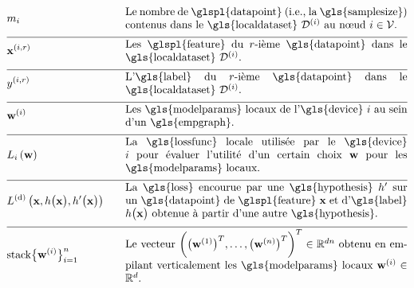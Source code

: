 \begin{align}
	&\localsamplesize{\nodeidx} & \quad & \parbox{.75\textwidth}{Le nombre de \glspl{datapoint} (i.e., la \gls{samplesize}) contenus dans le \gls{localdataset} $\localdataset{\nodeidx}$ au nœud $\nodeidx \in \nodes$.} \nonumber \\[2mm] \hline \nonumber\\[-5mm]
	&\featurevec^{(\nodeidx,\sampleidx)} & \quad & \parbox{.75\textwidth}{Les \glspl{feature} du $\sampleidx$-ième \gls{datapoint} dans le \gls{localdataset} $\localdataset{\nodeidx}$.} \nonumber \\[2mm] \hline \nonumber\\[-5mm]
	&\truelabel^{(\nodeidx,\sampleidx)} & \quad & \parbox{.75\textwidth}{L'\gls{label} du $\sampleidx$-ième \gls{datapoint} dans le \gls{localdataset} $\localdataset{\nodeidx}$.} \nonumber \\[2mm] \hline \nonumber\\[-5mm]
	&\localparams{\nodeidx} & \quad & \parbox{.75\textwidth}{Les \gls{modelparams} locaux de l'\gls{device} $\nodeidx$ au sein d’un \gls{empgraph}.} \nonumber \\[2mm] \hline \nonumber\\[-5mm]
	&\locallossfunc{\nodeidx}{\weights} & \quad & \parbox{.75\textwidth}{La \gls{lossfunc} locale utilisée par le \gls{device} $\nodeidx$ pour évaluer l’utilité d’un certain choix $\weights$ pour les \gls{modelparams} locaux.} \nonumber \\[2mm] \hline \nonumber\\[-5mm]
	&\gtvloss{\featurevec}{\hypothesis\big(\featurevec\big)}{\hypothesis'\big(\featurevec\big)} & \quad & \parbox{.75\textwidth}{La \gls{loss} encourue par une \gls{hypothesis} $\hypothesis'$ sur un \gls{datapoint} de \glspl{feature} $\featurevec$ et d'\gls{label} $\hypothesis\big( \featurevec\big)$ obtenue à partir d’une autre \gls{hypothesis}.} \nonumber \\[2mm] \hline \nonumber\\[-5mm]
	&{\rm stack} \big\{ \weights^{(\nodeidx)} \big\}_{\nodeidx=1}^{\nrnodes} & \quad & \parbox{.75\textwidth}{Le vecteur $\bigg( \big(\weights^{(1)}  \big)^{T}, \ldots, \big(\weights^{(\nrnodes)}  \big)^{T} \bigg)^{T} \in \mathbb{R}^{\dimlocalmodel\nrnodes}$ obtenu en empilant verticalement les \gls{modelparams} locaux $\weights^{(\nodeidx)} \in \mathbb{R}^{\dimlocalmodel}$.} \nonumber
\end{align}
        


